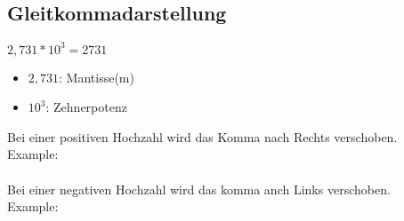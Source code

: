 \newpage
\subsection{Gleitkommadarstellung}

\hfill \break
$2,731*10^3 = 2731$
\begin{itemize}
    \item $2,731$: Mantisse(m)
    \item $10^3$: Zehnerpotenz
\end{itemize}

\hfill \break
Bei einer positiven Hochzahl wird das Komma nach Rechts verschoben.\\

\hfill \break
Example:\\
\fboxrule=0.8pt \\
\hfill \break
Bei einer negativen Hochzahl wird das komma anch Links verschoben.\\

\hfill \break
Example:\\
\fboxrule=0.8pt \\